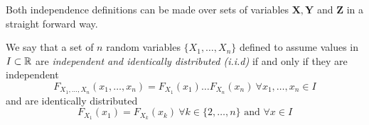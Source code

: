 Both independence definitions can be made over sets of variables \(\bm{X},
\bm{Y}\) and \(\bm{Z}\) in a straight forward way.


\begin{definition}
  We say that a set of \(n\) random variables \(\{X_1,\dots,X_n\}\) defined to
  assume values in \(I \subset \mathbb{R}\) are
  \emph{independent and identically distributed (i.i.d)}
  if and only if they are independent
  \[
    F_{X_1,\dots,X_n}(x_1,\dots,x_n) = F_{X_1}(x_1)\dots F_{X_n}(x_n) \ \forall
    x_1,\dots,x_n \in I
  \]
  and are identically distributed
  \[
    F_{X_1}(x_1) = F_{X_k}(x_k) \ \forall k \in \{2,\dots,n\} \text{ and } \forall x
    \in I
  \]


\end{definition}
